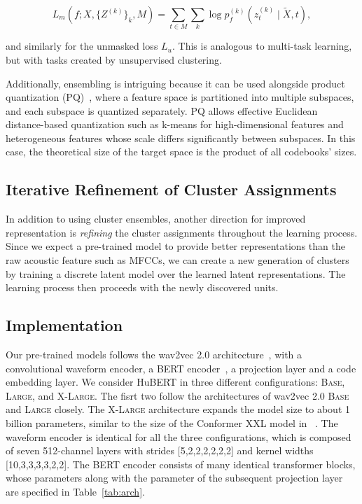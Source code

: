\begin{equation}
    L_m(f; X, \{ Z^{(k)} \}_k, M) = 
    \sum_{t \in M} \sum_{k} \log p_f^{(k)}(z_t^{(k)} \mid \tilde{X}, t), \label{eq:our_obj}
\end{equation}

and similarly for the unmasked loss $L_u$. This is analogous to multi-task learning, but with tasks created by unsupervised clustering.

Additionally, ensembling is intriguing because it can be used alongside product quantization (PQ)~\cite{gray1998quantization}, where a feature space is partitioned into multiple subspaces, and each subspace is quantized separately. PQ allows effective Euclidean distance-based quantization such as k-means for high-dimensional features and heterogeneous features whose scale differs significantly between subspaces. In this case, the theoretical size of the target space is the product of all codebooks' sizes.

\subsection{Iterative Refinement of Cluster Assignments} In addition to using cluster ensembles, another direction for improved representation is \textit{refining} the cluster assignments throughout the learning process. Since we expect a pre-trained model to provide better representations than the raw acoustic feature such as MFCCs, we can create a new generation of clusters by training a discrete latent model over the learned latent representations. The learning process then proceeds with the newly discovered units.

\subsection{Implementation}\label{sec:impl}
Our pre-trained models follows the wav2vec 2.0 architecture~\cite{baevski2020wav2vec}, with a convolutional waveform encoder, a BERT encoder~\cite{devlin2018bert}, a projection layer and a code embedding layer. We consider HuBERT in three different configurations: \textsc{Base}, \textsc{Large}, and \textsc{X-Large}. The fisrt two follow the architectures of wav2vec 2.0 \textsc{Base} and \textsc{Large} closely. The \textsc{X-Large} architecture expands the model size to about 1 billion parameters, similar to the size of the Conformer XXL model in ~\cite{zhang2020pushing}. The waveform encoder is identical for all the three configurations, which is composed of seven 512-channel layers with strides [5,2,2,2,2,2,2] and kernel widths [10,3,3,3,3,2,2]. The BERT encoder consists of many identical transformer blocks, whose parameters along with the parameter of the subsequent projection layer are specified in Table~\ref{tab:arch}.

